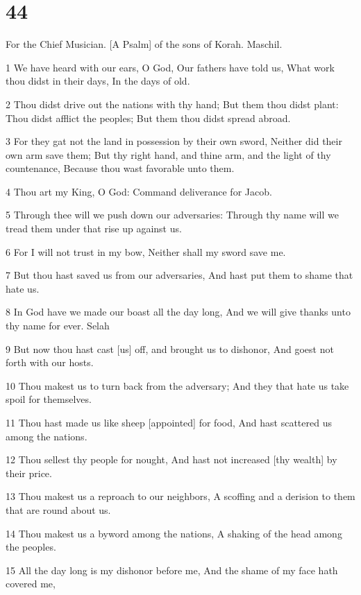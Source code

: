\chapter{44}

\par For the Chief Musician. [A Psalm] of the sons of Korah. Maschil.

\par 1 We have heard with our ears, O God, Our fathers have told us, What work thou didst in their days, In the days of old.
\par 2 Thou didst drive out the nations with thy hand; But them thou didst plant: Thou didst afflict the peoples; But them thou didst spread abroad.
\par 3 For they gat not the land in possession by their own sword, Neither did their own arm save them; But thy right hand, and thine arm, and the light of thy countenance, Because thou wast favorable unto them.
\par 4 Thou art my King, O God: Command deliverance for Jacob.
\par 5 Through thee will we push down our adversaries: Through thy name will we tread them under that rise up against us.
\par 6 For I will not trust in my bow, Neither shall my sword save me.
\par 7 But thou hast saved us from our adversaries, And hast put them to shame that hate us.
\par 8 In God have we made our boast all the day long, And we will give thanks unto thy name for ever. Selah
\par 9 But now thou hast cast [us] off, and brought us to dishonor, And goest not forth with our hosts.
\par 10 Thou makest us to turn back from the adversary; And they that hate us take spoil for themselves.
\par 11 Thou hast made us like sheep [appointed] for food, And hast scattered us among the nations.
\par 12 Thou sellest thy people for nought, And hast not increased [thy wealth] by their price.
\par 13 Thou makest us a reproach to our neighbors, A scoffing and a derision to them that are round about us.
\par 14 Thou makest us a byword among the nations, A shaking of the head among the peoples.
\par 15 All the day long is my dishonor before me, And the shame of my face hath covered me,
